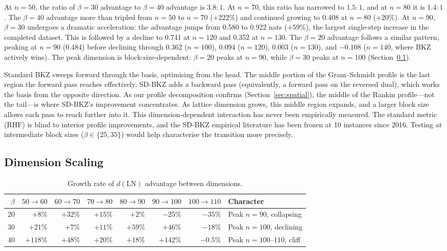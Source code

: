 \documentclass[journal=cic,version=preprint]{iacrj}
\begin{document}
At $n=50$, the ratio of $\beta=30$ advantage to $\beta=40$ advantage is $3.8{:}1$. At $n=70$, this ratio has narrowed to $1.5{:}1$, and at $n=80$ it is $1.4{:}1$. The $\beta=40$ advantage more than tripled from $n=50$ to $n=70$ ($+222\%$) and continued growing to 0.408 at $n=80$ ($+20\%$). At $n=90$, $\beta=30$ undergoes a dramatic acceleration: the advantage jumps from 0.580 to 0.922 nats ($+59\%$), the largest single-step increase in the completed dataset. This is followed by a decline to 0.741 at $n=120$ and 0.352 at $n=130$. The $\beta=20$ advantage follows a similar pattern, peaking at $n=90$ (0.484) before declining through 0.362 ($n=100$), 0.094 ($n=120$), 0.003 ($n=130$), and $-0.108$ ($n=140$, where BKZ actively wins). The peak dimension is block-size-dependent: $\beta=20$ peaks at $n=90$, while $\beta=30$ peaks at $n=100$ (Section~\ref{sec:dim-scaling}).

Standard BKZ sweeps forward through the basis, optimising from the head. The middle portion of the Gram--Schmidt profile is the last region the forward pass reaches effectively. SD-BKZ adds a backward pass (equivalently, a forward pass on the reversed dual), which works the basis from the opposite direction. As our profile decomposition confirms (Section~\ref{sec:spatial}), the middle of the Rankin profile---not the tail---is where SD-BKZ's improvement concentrates. As lattice dimension grows, this middle region expands, and a larger block size allows each pass to reach further into it. This dimension-dependent interaction has never been empirically measured. The standard metric (RHF) is blind to interior profile improvements, and the SD-BKZ empirical literature has been frozen at 10 instances since 2016. Testing at intermediate block sizes ($\beta\in\{25, 35\}$) would help characterise the transition more precisely.

\subsection{Dimension Scaling}
\label{sec:dim-scaling}

\begin{table}[tbp]
\centering
\caption{Growth rate of $d(\mathrm{LN})$ advantage between dimensions.\label{tab:growth}}
\small
\begin{tabular}{rrrrrrrl}
\hline
$\beta$ & $50{\to}60$ & $60{\to}70$ & $70{\to}80$ & $80{\to}90$ & $90{\to}100$ & $100{\to}110$ & Character \\
\hline
20 & $+8\%$   & $+32\%$ & $+15\%$ & $+2\%$   & $-25\%$  & $-35\%$ & Peak $n{=}90$, collapsing \\
30 & $+21\%$  & $+7\%$  & $+11\%$ & $+59\%$  & $+46\%$  & $-18\%$ & Peak $n{=}100$, declining \\
40 & $+118\%$ & $+48\%$ & $+20\%$ & $+18\%$  & $+142\%$ & $-0.5\%$ & Peak $n{=}100$--$110$, cliff \\
\hline
\end{tabular}
\end{table}
\end{document}
